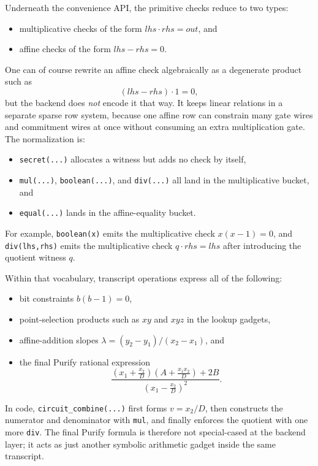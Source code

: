 \documentclass[11pt]{article}
\begin{document}
Underneath the convenience API, the primitive checks reduce to two types:
\begin{itemize}[nosep]
  \item multiplicative checks of the form $lhs \cdot rhs = out$, and
  \item affine checks of the form $lhs-rhs=0$.
\end{itemize}
One can of course rewrite an affine check algebraically as a degenerate product such as
\[
(lhs-rhs)\cdot 1 = 0,
\]
but the backend does \emph{not} encode it that way. It keeps linear relations in a separate sparse
row system, because one affine row can constrain many gate wires and commitment wires at once
without consuming an extra multiplication gate.
The normalization is:
\begin{itemize}[nosep]
  \item \texttt{secret(...)} allocates a witness but adds no check by itself,
  \item \texttt{mul(...)}, \texttt{boolean(...)}, and \texttt{div(...)} all land in the
  multiplicative bucket, and
  \item \texttt{equal(...)} lands in the affine-equality bucket.
\end{itemize}
For example, \texttt{boolean(x)} emits the multiplicative check $x(x-1)=0$, and
\texttt{div(lhs,rhs)} emits the multiplicative check $q \cdot rhs = lhs$ after introducing the
quotient witness $q$.

Within that vocabulary, transcript operations express all of the following:
\begin{itemize}[nosep]
  \item bit constraints $b(b-1)=0$,
  \item point-selection products such as $xy$ and $xyz$ in the lookup gadgets,
  \item affine-addition slopes $\lambda = (y_2-y_1)/(x_2-x_1)$, and
  \item the final Purify rational expression
  \[
  \frac{\left(x_1 + \frac{x_2}{D}\right)\left(A + \frac{x_1x_2}{D}\right) + 2B}
       {\left(x_1 - \frac{x_2}{D}\right)^2}.
  \]
\end{itemize}

In code, \texttt{circuit\_combine(...)} first forms $v = x_2 / D$, then constructs the numerator
and denominator with \texttt{mul}, and finally enforces the quotient with one more
\texttt{div}. The final Purify formula is therefore not special-cased at the backend layer; it acts as just
another symbolic arithmetic gadget inside the same transcript.
\end{document}
